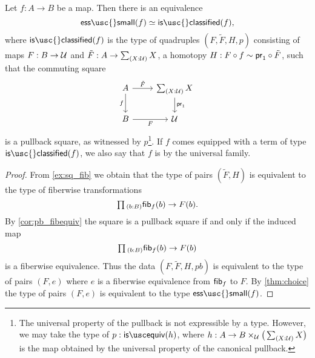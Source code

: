 \begin{thm}\label{thm:classifier}
Let $f:A\to B$ be a map. Then there is an equivalence
\begin{equation*}
\eqv{\mathsf{ess\usc{}small}(f)}{\mathsf{is\usc{}classified}(f)},
\end{equation*}
where $\mathsf{is\usc{}classified}(f)$ is the type of quadruples $(F,\tilde{F},H,p)$ consisting of maps
$F:B\to \mathcal{U}$ and $\tilde{F}:A\to \sm{X:\UU}X$, a homotopy $H:F\circ f\sim \mathsf{pr}_{1}\circ \tilde{F}$,  such that the commuting square
\begin{equation*}
\begin{tikzcd}
A \arrow[r,"\tilde{F}"] \arrow[d,swap,"f"] & \sm{X:\UU}X \arrow[d,"\proj 1"] \\
B \arrow[r,swap,"F"] & \UU
\end{tikzcd}
\end{equation*}
is a pullback square, as witnessed by $p$\footnote{The universal property of the pullback is not expressible by a type. However, we may take the type of $p:\isequiv(h)$, where $h:A\to B\times_\UU\big(\sm{X:\UU}X\big)$ is the map obtained by the universal property of the canonical pullback.}. If $f$ comes equipped with a term of type $\mathsf{is\usc{}classified}(f)$, we also say that $f$ is  by the universal family. 
\end{thm}

\begin{proof}
From \cref{ex:sq_fib} we obtain that the type of pairs $(\tilde{F},H)$ is equivalent to the type of fiberwise transformations
\begin{equation*}
\prd{b:B}\fib{f}{b}\to F(b).
\end{equation*}
By \cref{cor:pb_fibequiv} the square is a pullback square if and only if the induced map
\begin{equation*}
\prd{b:B}\fib{f}{b}\to F(b)
\end{equation*}
is a fiberwise equivalence. Thus the data $(F,\tilde{F},H,pb)$ is equivalent to the type of pairs $(F,e)$ where $e$ is a fiberwise equivalence from $\mathsf{fib}_{f}$ to $F$. By \cref{thm:choice} the type of pairs $(F,e)$ is equivalent to the type $\mathsf{ess\usc{}small}(f)$. 
\end{proof}

